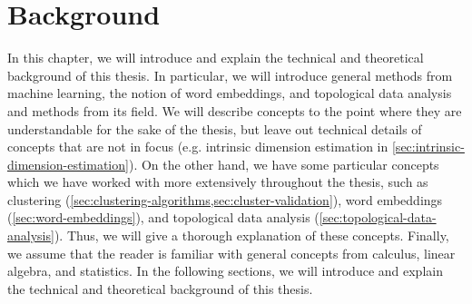 \chapter{Background}
\label{chap:background}
In this chapter, we will introduce and explain the technical and theoretical background of this thesis. In particular, we will introduce general methods from machine learning, the notion of word embeddings, and topological data analysis and methods from its field. We will describe concepts to the point where they are understandable for the sake of the thesis, but leave out technical details of concepts that are not in focus (e.g. intrinsic dimension estimation in \cref{sec:intrinsic-dimension-estimation}). On the other hand, we have some particular concepts which we have worked with more extensively throughout the thesis, such as clustering (\cref{sec:clustering-algorithms,sec:cluster-validation}), word embeddings (\cref{sec:word-embeddings}), and topological data analysis (\cref{sec:topological-data-analysis}). Thus, we will give a thorough explanation of these concepts. Finally, we assume that the reader is familiar with general concepts from calculus, linear algebra, and statistics. In the following sections, we will introduce and explain the technical and theoretical background of this thesis.



